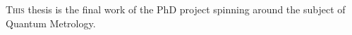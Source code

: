 \lettrine[lines=2, findent=3pt,nindent=0pt]{T}{his} thesis is the final work of the PhD project spinning around the subject of Quantum Metrology.
